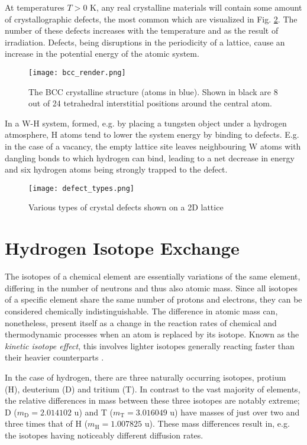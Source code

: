At temperatures $T > 0$ K, any real crystalline materials will contain some amount of crystallographic defects, the most common which are visualized in Fig. \ref{Fig:defect_types}. 
The number of these defects increases with the temperature and as the result of irradiation. 
Defects, being disruptions in the periodicity of a lattice, cause an increase in the potential energy of the atomic system. 
\begin{figure}[!ht]
\center
\texttt{[image: bcc\_render.png]}
\caption{The BCC crystalline structure (atoms in blue). Shown in black are 8 out of 24 tetrahedral interstitial positions around the central atom.}
\label{Fig:bcc}
\end{figure}
In a W-H system, formed, e.g. by placing a tungsten object under a hydrogen atmosphere, H atoms tend to lower the system energy by binding to defects. 
E.g. in the case of a vacancy, the empty lattice site leaves neighbouring W atoms with dangling bonds to which hydrogen can bind, leading to a net decrease in energy and six hydrogen atoms being strongly trapped to the defect.

\begin{figure}[!ht]
\center
\texttt{[image: defect\_types.png]}
\caption{Various types of crystal defects shown on a 2D lattice}
\label{Fig:defect_types}
\end{figure}


\section{Hydrogen Isotope Exchange}

The isotopes of a chemical element are essentially variations of the same element, differing in the number of neutrons and thus also atomic mass. 
Since all isotopes of a specific element share the same number of protons and electrons, they can be considered chemically indistinguishable. 
The difference in atomic mass can, nonetheless, present itself as a change in the reaction rates of chemical and thermodynamic processes when an atom is replaced by its isotope. 
Known as the \textit{kinetic isotope effect}, this involves lighter isotopes generally reacting faster than their heavier counterparts \cite{atkins2006atkins}.

In the case of hydrogen, there are three naturally occurring isotopes, protium (H), deuterium (D) and tritium (T). 
In contrast to the vast majority of elements, the relative differences in mass between these three isotopes are notably extreme; D ($m_{\text{D}}=2.014102$ u) and T ($m_{\text{T}}=3.016049$ u) have masses of just over two and three times that of H ($m_{\text{H}}=1.007825$ u). 
These mass differences result in, e.g. the isotopes having noticeably different diffusion rates.

